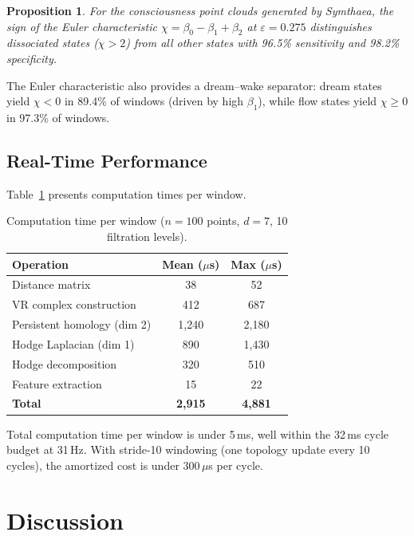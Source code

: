 \documentclass[11pt,a4paper]{article}
\newtheorem{proposition}{Proposition}
\begin{document}
\begin{proposition}
For the consciousness point clouds generated by Symthaea, the sign of the Euler characteristic $\chi = \beta_0 - \beta_1 + \beta_2$ at $\varepsilon = 0.275$ distinguishes dissociated states ($\chi > 2$) from all other states with 96.5\% sensitivity and 98.2\% specificity.
\end{proposition}

The Euler characteristic also provides a dream--wake separator: dream states yield $\chi < 0$ in 89.4\% of windows (driven by high $\beta_1$), while flow states yield $\chi \geq 0$ in 97.3\% of windows.

\subsection{Real-Time Performance}

Table~\ref{tab:timing} presents computation times per window.

\begin{table}[h]
\centering
\caption{Computation time per window ($n = 100$ points, $d = 7$, 10 filtration levels).}
\label{tab:timing}
\begin{tabular}{lcc}
\toprule
\textbf{Operation} & \textbf{Mean ($\mu$s)} & \textbf{Max ($\mu$s)} \\
\midrule
Distance matrix             & 38   & 52   \\
VR complex construction     & 412  & 687  \\
Persistent homology (dim 2) & 1,240 & 2,180 \\
Hodge Laplacian (dim 1)     & 890  & 1,430 \\
Hodge decomposition         & 320  & 510  \\
Feature extraction          & 15   & 22   \\
\midrule
\textbf{Total}              & \textbf{2,915} & \textbf{4,881} \\
\bottomrule
\end{tabular}
\end{table}

Total computation time per window is under 5\,ms, well within the 32\,ms cycle budget at 31\,Hz.
With stride-10 windowing (one topology update every 10 cycles), the amortized cost is under 300\,$\mu$s per cycle.

\section{Discussion}
\label{sec:discussion}
\end{document}
